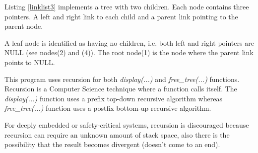 Listing \ref{linklist3} implements a tree with two children. Each node contains three pointers. A left and right link to each child and a parent link pointing to the parent node. 

A leaf node is identified as having no children, i.e. both left and right pointers are NULL (see nodes(2) and (4)). The root node(1) is the node where the parent link points to NULL. 

This program uses recursion for both \textit{display(...)} and \textit{free\_tree(...)} functions. Recursion is a Computer Science technique where a function calls itself. The \textit{display(...)} function uses a prefix top-down recursive algorithm whereas \textit{free\_tree(...)} function uses a postfix bottom-up recursive algorithm.

For deeply embedded or safety-critical systems, recursion is discouraged because recursion can require an unknown amount of stack space, also there is the possibility that the result becomes divergent (doesn't come to an end).
